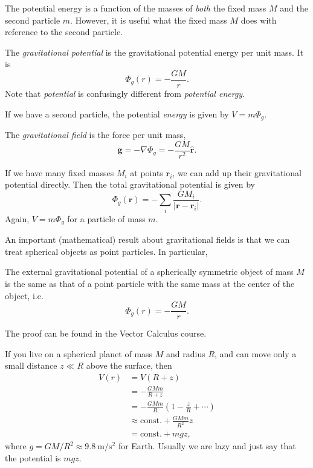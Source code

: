 \documentclass[a4paper]{article}
\begin{document}
The potential energy is a function of the masses of \emph{both} the fixed mass $M$ and the second particle $m$. However, it is useful what the fixed mass $M$ does with reference to the second particle.
\begin{defi}
  The \emph{gravitational potential} is the gravitational potential energy per unit mass. It is
  \[
    \Phi_g(r) = -\frac{GM}{r}.
  \]
  Note that \emph{potential} is confusingly different from \emph{potential energy}.

  If we have a second particle, the potential \emph{energy} is given by $V = m\Phi_g$.

  The \emph{gravitational field} is the force per unit mass,
  \[
    \mathbf{g} = -\nabla \Phi_g = -\frac{GM}{r^2}\hat{\mathbf{r}}.
  \]
\end{defi}

If we have many fixed masses $M_i$ at points $\mathbf{r}_i$, we can add up their gravitational potential directly. Then the total gravitational potential is given by
\[
  \Phi_g(\mathbf{r}) = -\sum_i \frac{GM_i}{|\mathbf{r} - \mathbf{r}_i|}.
\]
Again, $V = m\Phi_g$ for a particle of mass $m$.

An important (mathematical) result about gravitational fields is that we can treat spherical objects as point particles. In particular,
\begin{prop}
  The external gravitational potential of a spherically symmetric object of mass $M$ is the same as that of a point particle with the same mass at the center of the object, i.e.
  \[
    \Phi_g(r) = -\frac{GM}{r}.
  \]
\end{prop}
The proof can be found in the Vector Calculus course.

\begin{eg}
  If you live on a spherical planet of mass $M$ and radius $R$, and can move only a small distance $z \ll R$ above the surface, then
  \begin{align*}
    V(r) &= V(R + z)\\
    &= -\frac{GMm}{R + z}\\
    &= -\frac{GMm}{R}\left(1 - \frac{z}{R} + \cdots\right)\\
    &\approx \text{const.} + \frac{GMm}{R^2}z\\
    &= \text{const.} + mgz,
  \end{align*}
  where $g = GM/R^2 \approx \SI{9.8}{\meter\per\second\squared}$ for Earth. Usually we are lazy and just say that the potential is $mgz$.
\end{eg}
\end{document}
